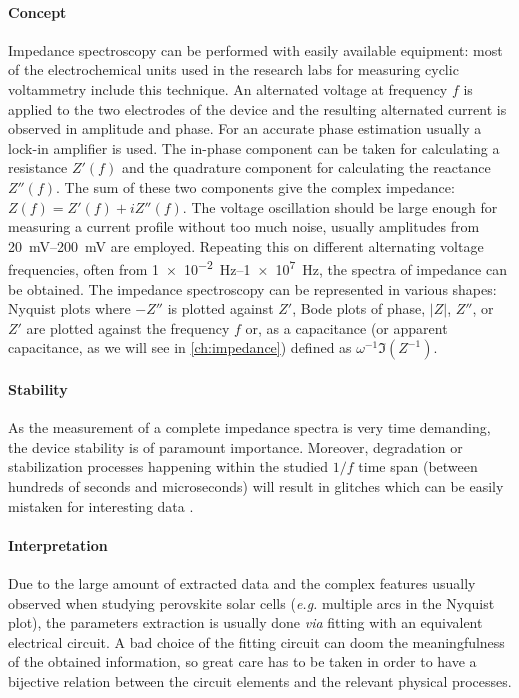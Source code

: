 \paragraph{Concept}
Impedance spectroscopy can be performed with easily available equipment: most of the electrochemical units used in the research labs for measuring cyclic voltammetry include this technique.
An alternated voltage at frequency $f$ is applied to the two electrodes of the device and the resulting alternated current is observed in amplitude and phase.
For an accurate phase estimation usually a lock-in amplifier is used.
The in-phase component can be taken for calculating a resistance $Z'(f)$ and the quadrature component for calculating the reactance $Z''(f)$.
The sum of these two components give the complex impedance: $Z(f) = Z'(f) + iZ''(f)$.
The voltage oscillation should be large enough for measuring a current profile without too much noise, usually amplitudes from \SIrange{20}{200}{\mV} are employed.
Repeating this on different alternating voltage frequencies, often from \SIrange{1e-2}{1e7}{\Hz}, the spectra of impedance can be obtained.
The impedance spectroscopy can be represented in various shapes: Nyquist plots where $-Z''$ is plotted against $Z'$, Bode plots of phase, $|Z|$, $Z''$, or $Z'$ are plotted against the frequency $f$ or, as a capacitance (or apparent capacitance, as we will see in \cref{ch:impedance}) defined as $\omega^{-1}\Im(Z^{-1})$.

\paragraph{Stability}
As the measurement of a complete impedance spectra is very time demanding, the device stability is of paramount importance.
Moreover, degradation or stabilization processes happening within the studied $1/f$ time span (between hundreds of seconds and microseconds) will result in glitches which can be easily mistaken for interesting data \cite{Jacobs2018,Moia2019}.

\paragraph{Interpretation}
Due to the large amount of extracted data and the complex features usually observed when studying perovskite solar cells (\textit{e.g.} multiple arcs in the Nyquist plot), the parameters extraction is usually done \textit{via} fitting with an equivalent electrical circuit.
A bad choice of the fitting circuit can doom the meaningfulness of the obtained information, so great care has to be taken in order to have a bijective relation between the circuit elements and the relevant physical processes. 

